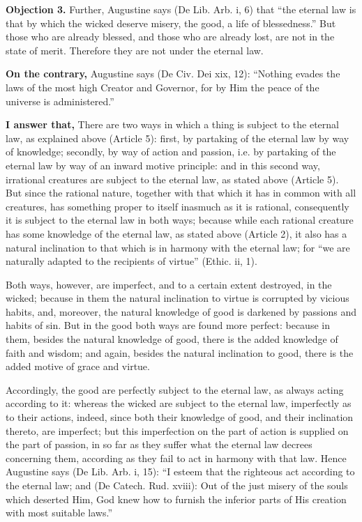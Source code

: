 \textbf{Objection 3.} Further, Augustine says (De Lib. Arb. i, 6) that ``the eternal law is that by which the wicked deserve misery, the good, a life of blessedness.'' But those who are already blessed, and those who are already lost, are not in the state of merit. Therefore they are not under the eternal law.

\textbf{On the contrary,} Augustine says (De Civ. Dei xix, 12): ``Nothing evades the laws of the most high Creator and Governor, for by Him the peace of the universe is administered.''

\textbf{I answer that,} There are two ways in which a thing is subject to the eternal law, as explained above (Article 5): first, by partaking of the eternal law by way of knowledge; secondly, by way of action and passion, i.e. by partaking of the eternal law by way of an inward motive principle: and in this second way, irrational creatures are subject to the eternal law, as stated above (Article 5). But since the rational nature, together with that which it has in common with all creatures, has something proper to itself inasmuch as it is rational, consequently it is subject to the eternal law in both ways; because while each rational creature has some knowledge of the eternal law, as stated above (Article 2), it also has a natural inclination to that which is in harmony with the eternal law; for ``we are naturally adapted to the recipients of virtue'' (Ethic. ii, 1).

Both ways, however, are imperfect, and to a certain extent destroyed, in the wicked; because in them the natural inclination to virtue is corrupted by vicious habits, and, moreover, the natural knowledge of good is darkened by passions and habits of sin. But in the good both ways are found more perfect: because in them, besides the natural knowledge of good, there is the added knowledge of faith and wisdom; and again, besides the natural inclination to good, there is the added motive of grace and virtue.

Accordingly, the good are perfectly subject to the eternal law, as always acting according to it: whereas the wicked are subject to the eternal law, imperfectly as to their actions, indeed, since both their knowledge of good, and their inclination thereto, are imperfect; but this imperfection on the part of action is supplied on the part of passion, in so far as they suffer what the eternal law decrees concerning them, according as they fail to act in harmony with that law. Hence Augustine says (De Lib. Arb. i, 15): ``I esteem that the righteous act according to the eternal law; and (De Catech. Rud. xviii): Out of the just misery of the souls which deserted Him, God knew how to furnish the inferior parts of His creation with most suitable laws.''

